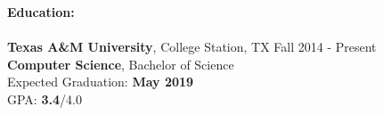 \documentclass[12pt]{article}
\begin{document}
\begin{flushleft}
  \begin{outline}[compactitem]

    \newlength{\upspacelength}
    \setlength{\upspacelength}{-0.6px}
    \newcommand{\upspace}{\vspace{\upspacelength}}
    \newcommand{\zzz}[1]{\upspace \0 \textbf{#1} \\ \vspace{-0.8\baselineskip} \hrulefill \vspace{-2px} \\ }
    \let\oldOne\1\let\oldTwo\2\let\oldThree\3\let\oldFour\4
    \renewcommand{\1}{\upspace \oldOne  }
    \renewcommand{\2}{\upspace \oldTwo  }
    \renewcommand{\3}{\upspace \oldThree}
    \renewcommand{\4}{\upspace \oldFour }



    \zzz{Education:}
    \1 \textbf{Texas A\&M University}, College Station, TX \hfill Fall 2014 - Present
    \\ \textbf{Computer Science}, Bachelor of Science
    \\ Expected Graduation: \textbf{May 2019}
    \\ GPA:  \textbf{3.4}/4.0


\end{outline}
\end{flushleft}
\end{document}
